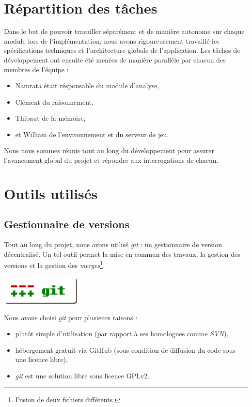 \section{Répartition des tâches}

Dans le but de pouvoir travailler séparément et de manière autonome sur chaque module lors de l'implémentation, nous avons rigoureusement travaillé les spécifications techniques et l'architecture globale de l'application. Les tâches de développement ont ensuite été  menées de manière parallèle par chacun des membres de l'équipe :

\begin{itemize}
\item Namrata était résponsable du module d'analyse,
\item Clément du raisonnement,
\item Thibaut de la mémoire,
\item et William de l'environnement et du serveur de jeu.
\end{itemize}   

Nous nous sommes réunis tout au long du développement pour assurer l'avancement global du projet et répondre aux interrogations de chacun.

\section{Outils utilisés}

\subsection{Gestionnaire de versions}
Tout au long du projet, nous avons utilisé \emph{git} : un gestionnaire de version décentralisé. Un tel outil permet la mise en commun des travaux, la gestion des versions et la gestion des \emph{merges}\footnote{Fusion de deux fichiers différents.}. 

\begin{center}
	\includegraphics[width=0.3\textwidth]{files/outils/git}	
\end{center}

Nous avons choisi \emph{git} pour plusieurs raisons :

\begin{itemize}
\item plutôt simple d'utilisation (par rapport à ses homologues comme \emph{SVN}),
\item hébergement gratuit via GitHub (sous condition de diffusion du code sous une licence libre),
\item \emph{git} est une solution libre sous licence \gls{GPLv2}.
\end{itemize}

